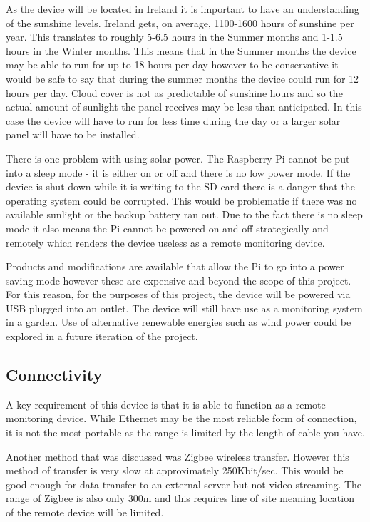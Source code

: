 \documentclass[10pt,a4paper]{article}
\begin{document}
As the device will be located in Ireland it is important to have an understanding of the sunshine levels. Ireland gets, on average, 1100-1600 hours of sunshine per year\cite{website:metsunshine}. This translates to roughly 5-6.5 hours in the Summer months and 1-1.5 hours in the Winter months. This means that in the Summer months the device may be able to run for up to 18 hours per day however to be conservative it would be safe to say that during the summer months the device could run for 12 hours per day. Cloud cover is not as predictable of sunshine hours and so the actual amount of sunlight the panel receives may be less than anticipated. In this case the device will have to run for less time during the day or a larger solar panel will have to be installed. 

There is one problem with using solar power. The Raspberry Pi cannot be put into a sleep mode - it is either on or off and there is no low power mode. If the device is shut down while it is writing to the SD card there is a danger that the operating system could be corrupted. This would be problematic if there was no available sunlight or the backup battery ran out. Due to the fact there is no sleep mode it also means the Pi cannot be powered on and off strategically and remotely which renders the device useless as a remote monitoring device. 

Products and modifications are available that allow the Pi to go into a power saving mode however these are expensive and beyond the scope of this project. For this reason, for the purposes of this project, the device will be powered via USB plugged into an outlet. The device will still have use as a monitoring system in a garden. Use of alternative renewable energies such as wind power could be explored in a future iteration of the project.


\subsection{Connectivity}
A key requirement of this device is that it is able to function as a remote monitoring device. While Ethernet may be the most reliable form of connection, it is not the most portable as the range is limited by the length of cable you have. 

Another method that was discussed was Zigbee wireless transfer. However this method of transfer is very slow at approximately 250Kbit/sec. This would be good enough for data transfer to an external server but not video streaming. The range of Zigbee is also only 300m and this requires line of site meaning location of the remote device will be limited. 
\end{document}
